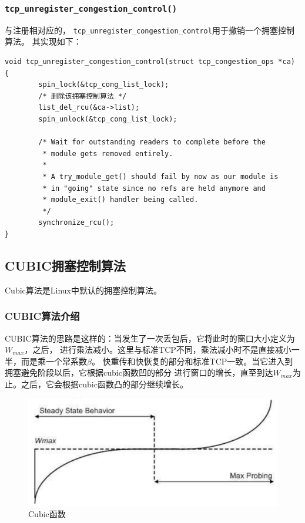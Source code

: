 		\subsubsection{\texttt{tcp_unregister_congestion_control()}}
			与注册相对应的，
			\texttt{tcp_unregister_congestion_control}用于撤销一个拥塞控制算法。
			其实现如下：
\begin{verbatim}
void tcp_unregister_congestion_control(struct tcp_congestion_ops *ca)
{
        spin_lock(&tcp_cong_list_lock);
        /* 删除该拥塞控制算法 */
        list_del_rcu(&ca->list);
        spin_unlock(&tcp_cong_list_lock);

        /* Wait for outstanding readers to complete before the
         * module gets removed entirely.
         *
         * A try_module_get() should fail by now as our module is
         * in "going" state since no refs are held anymore and
         * module_exit() handler being called.
         */
        synchronize_rcu();
}
\end{verbatim}

	\subsection{CUBIC拥塞控制算法}
		Cubic算法是Linux中默认的拥塞控制算法。

			\subsubsection{CUBIC算法介绍}
				CUBIC算法的思路是这样的：当发生了一次丢包后，它将此时的窗口大小定义为$W_{max}$，之后，
				进行乘法减小。这里与标准TCP不同，乘法减小时不是直接减小一半，而是乘一个常系数$\beta$。
				快重传和快恢复的部分和标准TCP一致。当它进入到拥塞避免阶段以后，它根据cubic函数凹的部分
				进行窗口的增长，直至到达$W_{max}$为止。之后，它会根据cubic函数凸的部分继续增长。

\begin{figure}[htpb]
\centering
\includegraphics[width=\textwidth]  {images/cubic.png}
\caption{Cubic函数}
\end{figure}


